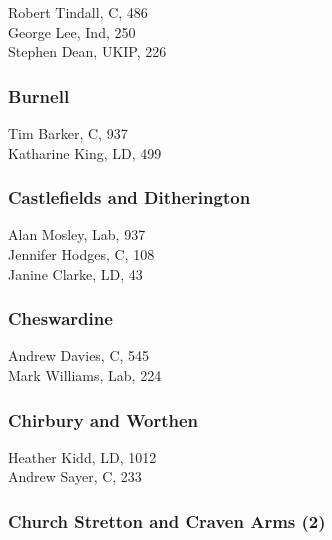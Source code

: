 \documentclass[a4paper,openany,10pt]{book}
\begin{document}


Robert Tindall, C, 486\\
George Lee, Ind, 250\\
Stephen Dean, UKIP, 226\\


\subsubsection*{Burnell}



Tim Barker, C, 937\\
Katharine King, LD, 499\\


\subsubsection*{Castlefields and Ditherington}



Alan Mosley, Lab, 937\\
Jennifer Hodges, C, 108\\
Janine Clarke, LD, 43\\


\subsubsection*{Cheswardine}



Andrew Davies, C, 545\\
Mark Williams, Lab, 224\\


\subsubsection*{Chirbury and Worthen}



Heather Kidd, LD, 1012\\
Andrew Sayer, C, 233\\


\subsubsection*{Church Stretton and Craven Arms (2)}
\end{document}

